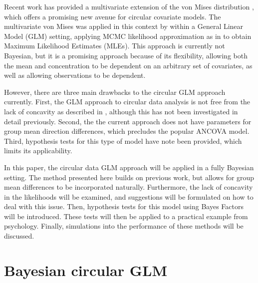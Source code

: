 \documentclass[10pt,a4paper]{article}\usepackage[]{graphicx}\usepackage[]{color}
\begin{document}
Recent work has provided a multivariate extension of the von Mises distribution \citep{mardia2008multivariate,mardia2014some}, which offers a promising new avenue for circular covariate models. The multivariate von Mises was applied in this context by \citet{lagona2014regression} within a General Linear Model (GLM) setting, applying MCMC likelihood approximation as in \citet{geyer1992constrained} to obtain Maximum Likelihood Estimates (MLEs). This approach is currently not Bayesian, but it is a promising approach because of its flexibility, allowing both the mean and concentration to be dependent on an arbitrary set of covariates, as well as allowing observations to be dependent.

However, there are three main drawbacks to the circular GLM approach currently. First, the GLM approach to circular data analysis is not free from the lack of concavity as described in \citet{gill2010}, although this has not been investigated in detail previously. Second, the the current approach does not have parameters for group mean direction differences, which precludes the popular ANCOVA model. Third, hypothesis tests for this type of model have note been provided, which limits its applicability.

In this paper, the circular data GLM approach will be applied in a fully Bayesian setting. The method presented here builds on previous work, but allows for group mean differences to be incorporated naturally. Furthermore, the lack of concavity in the likelihoods will be examined, and suggestions will be formulated on how to deal with this issue. Then, hypothesis tests for this model using Bayes Factors will be introduced. These tests will then be applied to a practical example from psychology. Finally, simulations into the performance of these methods will be discussed.









\section{Bayesian circular GLM}
\end{document}
